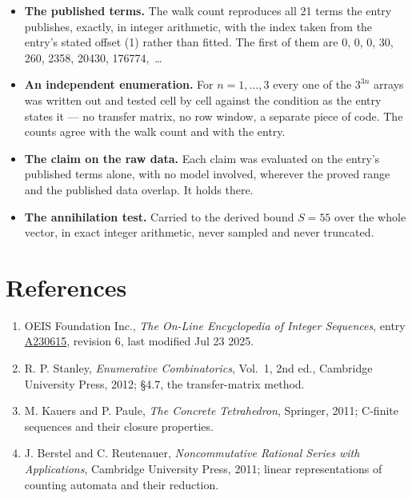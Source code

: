 \documentclass[11pt]{article}
\theoremstyle{definition}
\begin{document}
\begin{itemize}

\item {\bfseries The published terms.} The walk count reproduces all 21 terms the entry publishes, exactly, in integer arithmetic, with the index taken from the entry's stated offset (1) rather than fitted. The first of them are 0, 0, 0, 30, 260, 2358, 20430, 176774,~\dots

\item {\bfseries An independent enumeration.} For $n = 1,\dots,3$ every one of the $3^{3n}$ arrays was written out and tested cell by cell against the condition as the entry states it --- no transfer matrix, no row window, a separate piece of code. The counts agree with the walk count and with the entry.

\item {\bfseries The claim on the raw data.} Each claim was evaluated on the entry's published terms alone, with no model involved, wherever the proved range and the published data overlap. It holds there.

\item {\bfseries The annihilation test.} Carried to the derived bound $S = 55$ over the whole vector, in exact integer arithmetic, never sampled and never truncated.

\end{itemize}

\section{References}

\begin{enumerate}

\item OEIS Foundation Inc., \emph{The On-Line Encyclopedia of Integer Sequences}, entry \href{https://oeis.org/A230615}{A230615}, revision 6, last modified Jul 23 2025.

\item R. P. Stanley, \emph{Enumerative Combinatorics}, Vol.~1, 2nd ed., Cambridge University Press, 2012; \S4.7, the transfer-matrix method.

\item M. Kauers and P. Paule, \emph{The Concrete Tetrahedron}, Springer, 2011; C-finite sequences and their closure properties.

\item J. Berstel and C. Reutenauer, \emph{Noncommutative Rational Series with Applications}, Cambridge University Press, 2011; linear representations of counting automata and their reduction.

\end{enumerate}
\end{document}
